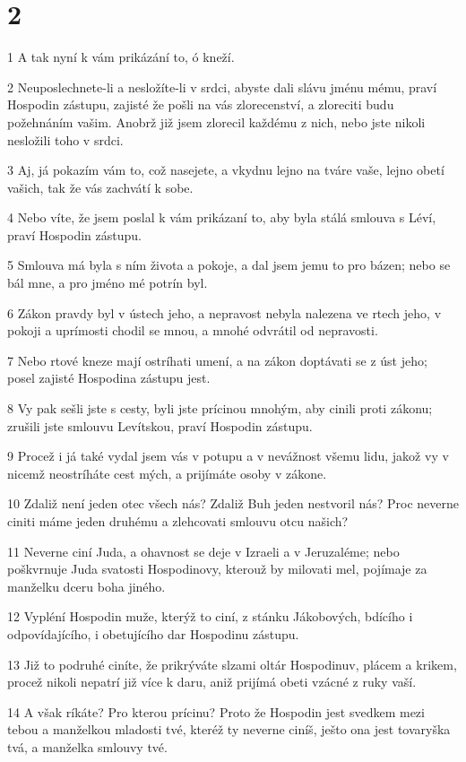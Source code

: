 \chapter{2}

\par 1 A tak nyní k vám prikázání to, ó kneží.
\par 2 Neuposlechnete-li a nesložíte-li v srdci, abyste dali slávu jménu mému, praví Hospodin zástupu, zajisté že pošli na vás zlorecenství, a zloreciti budu požehnáním vašim. Anobrž již jsem zlorecil každému z nich, nebo jste nikoli nesložili toho v srdci.
\par 3 Aj, já pokazím vám to, což nasejete, a vkydnu lejno na tváre vaše, lejno obetí vašich, tak že vás zachvátí k sobe.
\par 4 Nebo víte, že jsem poslal k vám prikázaní to, aby byla stálá smlouva s Léví, praví Hospodin zástupu.
\par 5 Smlouva má byla s ním života a pokoje, a dal jsem jemu to pro bázen; nebo se bál mne, a pro jméno mé potrín byl.
\par 6 Zákon pravdy byl v ústech jeho, a nepravost nebyla nalezena ve rtech jeho, v pokoji a uprímosti chodil se mnou, a mnohé odvrátil od nepravosti.
\par 7 Nebo rtové kneze mají ostríhati umení, a na zákon doptávati se z úst jeho; posel zajisté Hospodina zástupu jest.
\par 8 Vy pak sešli jste s cesty, byli jste prícinou mnohým, aby cinili proti zákonu; zrušili jste smlouvu Levítskou, praví Hospodin zástupu.
\par 9 Procež i já také vydal jsem vás v potupu a v nevážnost všemu lidu, jakož vy v nicemž neostríháte cest mých, a prijímáte osoby v zákone.
\par 10 Zdaliž není jeden otec všech nás? Zdaliž Buh jeden nestvoril nás? Proc neverne ciniti máme jeden druhému a zlehcovati smlouvu otcu našich?
\par 11 Neverne ciní Juda, a ohavnost se deje v Izraeli a v Jeruzaléme; nebo poškvrnuje Juda svatosti Hospodinovy, kterouž by milovati mel, pojímaje za manželku dceru boha jiného.
\par 12 Vypléní Hospodin muže, kterýž to ciní, z stánku Jákobových, bdícího i odpovídajícího, i obetujícího dar Hospodinu zástupu.
\par 13 Již to podruhé ciníte, že prikrýváte slzami oltár Hospodinuv, plácem a krikem, procež nikoli nepatrí již více k daru, aniž prijímá obeti vzácné z ruky vaší.
\par 14 A však ríkáte? Pro kterou prícinu? Proto že Hospodin jest svedkem mezi tebou a manželkou mladosti tvé, kteréž ty neverne ciníš, ješto ona jest tovaryška tvá, a manželka smlouvy tvé.

